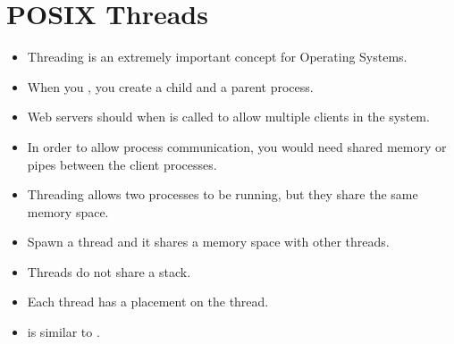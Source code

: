 \documentclass[]{article}
\begin{document}
\section{POSIX Threads}
\begin{itemize}
\item Threading is an extremely important concept for Operating Systems.
\item When you , you create a child and a parent process.
\item Web servers should  when  is called to allow
multiple clients in the system.
\item In order to allow process communication, you would need shared memory or
pipes between the client processes.
\item Threading allows two processes to be running, but they share the same
memory space.
\item Spawn a thread and it shares a memory space with other threads.
\item Threads do not share a stack.
\item Each thread has a placement on the thread.
\item {} is similar to .
\end{itemize}
\end{document}
